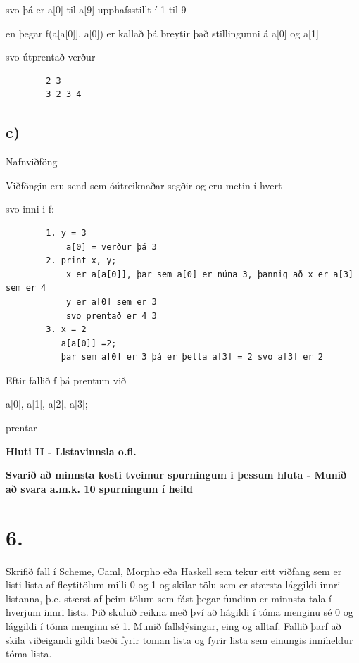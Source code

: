 \documentclass{article}
\begin{document}
     svo þá er a[0] til a[9] upphafsstillt í 1 til 9

     en þegar f(a[a[0]], a[0]) er kallað þá breytir það stillingunni á a[0] og a[1]

     svo útprentað verður

     \begin{verbatim}
        2 3
        3 2 3 4
     \end{verbatim}


      


     \subsection{c)} Nafnviðföng


     Viðföngin eru send sem óútreiknaðar segðir og eru metin í hvert 

     svo inni i f:

     \begin{verbatim}
        1. y = 3
            a[0] = verður þá 3
        2. print x, y;
            x er a[a[0]], þar sem a[0] er núna 3, þannig að x er a[3] sem er 4
            y er a[0] sem er 3
            svo prentað er 4 3
        3. x = 2
           a[a[0]] =2;
           þar sem a[0] er 3 þá er þetta a[3] = 2 svo a[3] er 2
     \end{verbatim}

     Eftir fallið f þá prentum við 
     
     a[0], a[1], a[2], a[3];
     
     prentar 

     \newpage

     \begin{center}
        \textbf{Hluti II - Listavinnsla o.fl.}


        \textbf{Svarið að minnsta kosti tveimur spurningum i þessum hluta - Munið að svara a.m.k. 10 spurningum í heild}
     \end{center}

     \section{6.}
     Skrifið fall í Scheme, Caml, Morpho eða Haskell sem tekur eitt viðfang sem er listi lista af fleytitölum milli 0 og 1 og skilar tölu sem 
     er stærsta lággildi innri listanna, þ.e. stærst af þeim tölum sem fást 
     þegar fundinn er minnsta tala í hverjum innri lista. Þið skuluð reikna
     með því að hágildi í tóma menginu sé 0 og lággildi í tóma menginu sé 1.
     Munið fallslýsingar, eing og alltaf. Fallið þarf að skila viðeigandi 
     gildi bæði fyrir toman lista og fyrir lista sem einungis inniheldur tóma lista.
\end{document}
